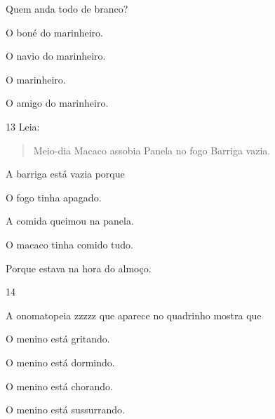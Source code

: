 Quem anda todo de branco?

\begin{escolha}
\item O boné do marinheiro.

\item O navio do marinheiro.

\item O marinheiro.

\item O amigo do marinheiro.
\end{escolha}

\num{13} Leia:

\begin{verse}
Meio-dia
Macaco assobia
Panela no fogo
Barriga vazia.
\end{verse}


A barriga está vazia porque

\begin{escolha}
\item O fogo tinha apagado.

\item A comida queimou na panela.

\item O macaco tinha comido tudo.

\item Porque estava na hora do almoço.
\end{escolha}


\num{14}


A onomatopeia zzzzz que aparece no quadrinho mostra que

\begin{escolha}
\item O menino está gritando.

\item O menino está dormindo.

\item O menino está chorando.

\item O menino está sussurrando.
\end{escolha}

